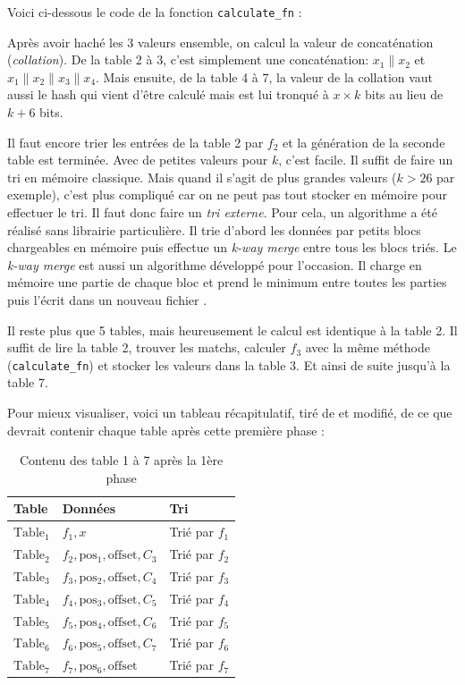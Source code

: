 Voici ci-dessous le code de la fonction \verb|calculate_fn| :


Après avoir haché les 3 valeurs ensemble, on calcul la valeur de concaténation (\emph{collation}). De la table 2 à 3, c'est simplement une concaténation: $x_1\|x_2$ et $x_1\|x_2\|x_3\|x_4$. Mais ensuite, de la table 4 à 7, la valeur de la collation vaut aussi le hash qui vient d'être calculé mais est lui tronqué à $x \times k$ bits au lieu de $k + 6$ bits.

Il faut encore trier les entrées de la table 2 par $f_2$ et la génération de la seconde table est terminée. Avec de petites valeurs pour $k$, c'est facile. Il suffit de faire un tri en mémoire classique. Mais quand il s'agit de plus grandes valeurs ($k > 26$ par exemple), c'est plus compliqué car on ne peut pas tout stocker en mémoire pour effectuer le tri. Il faut donc faire un \emph{tri externe}. Pour cela, un algorithme a été réalisé sans librairie particulière. Il trie d'abord les données par petits blocs chargeables en mémoire puis effectue un \emph{k-way merge} entre tous les blocs triés. Le \emph{k-way merge} est aussi un algorithme développé pour l'occasion. Il charge en mémoire une partie de chaque bloc et prend le minimum entre toutes les parties puis l'écrit dans un nouveau fichier \cite{wiki:externalsort}.

Il reste plus que 5 tables, mais heureusement le calcul est identique à la table 2. Il suffit de lire la table 2, trouver les matchs, calculer $f_3$ avec la même méthode (\verb|calculate_fn|) et stocker les valeurs dans la table 3. Et ainsi de suite jusqu'à la table 7.

Pour mieux visualiser, voici un tableau récapitulatif, tiré de \cite{chia:construction} et modifié, de ce que devrait contenir chaque table après cette première phase :

\begin{table}[H]
  \centering
  \begin{tabular}{l l l}
    \textbf{Table} & \textbf{Données} & \textbf{Tri} \\
    \hline
    \hline
    $\mathrm{Table_1}$ & $f_1,x$ & Trié par $f_1$ \\
    \hline
    $\mathrm{Table_2}$ & $f_2,\mathrm{pos_1},\mathrm{offset},C_3$ & Trié par $f_2$ \\
    \hline
    $\mathrm{Table_3}$ & $f_3,\mathrm{pos_2},\mathrm{offset},C_4$ & Trié par $f_3$ \\
    \hline
    $\mathrm{Table_4}$ & $f_4,\mathrm{pos_3},\mathrm{offset},C_5$ & Trié par $f_4$ \\
    \hline
    $\mathrm{Table_5}$ & $f_5,\mathrm{pos_4},\mathrm{offset},C_6$ & Trié par $f_5$ \\
    \hline
    $\mathrm{Table_6}$ & $f_6,\mathrm{pos_5},\mathrm{offset},C_7$ & Trié par $f_6$ \\
    \hline
    $\mathrm{Table_7}$ & $f_7,\mathrm{pos_6},\mathrm{offset}$ & Trié par $f_7$ \\
    \hline
  \end{tabular}
  \caption{Contenu des table 1 à 7 après la 1ère phase}
\end{table}

